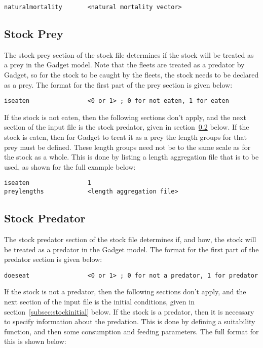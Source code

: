 \documentclass [a4paper, 10pt]{book}
\begin{document}
{\small\begin{verbatim}
naturalmortality       <natural mortality vector>
\end{verbatim}}

\subsection{Stock Prey}\label{subsec:stockprey}
The stock prey section of the stock file determines if the stock will be treated as a prey in the Gadget model.  Note that the fleets are treated as a predator by Gadget, so for the stock to be caught by the fleets, the stock needs to be declared as a prey.  The format for the first part of the prey section is given below:

{\small\begin{verbatim}
iseaten                <0 or 1> ; 0 for not eaten, 1 for eaten
\end{verbatim}}

If the stock is not eaten, then the following sections don't apply, and the next section of the input file is the stock predator, given in section~\ref{subsec:stockpredator} below.  If the stock is eaten, then for Gadget to treat it as a prey the length groups for that prey must be defined.  These length groups need not be to the same scale as for the stock as a whole.  This is done by listing a length aggregation file that is to be used, as shown for the full example below:

{\small\begin{verbatim}
iseaten                1
preylengths            <length aggregation file>
\end{verbatim}}

\subsection{Stock Predator}\label{subsec:stockpredator}
The stock predator section of the stock file determines if, and how, the stock will be treated as a predator in the Gadget model.  The format for the first part of the predator section is given below:

{\small\begin{verbatim}
doeseat                <0 or 1> ; 0 for not a predator, 1 for predator
\end{verbatim}}

If the stock is not a predator, then the following sections don't apply, and the next section of the input file is the initial conditions, given in section~\ref{subsec:stockinitial} below.  If the stock is a predator, then it is necessary to specify information about the predation.  This is done by defining a suitability function, and then some consumption and feeding parameters.  The full format for this is shown below:
\end{document}
